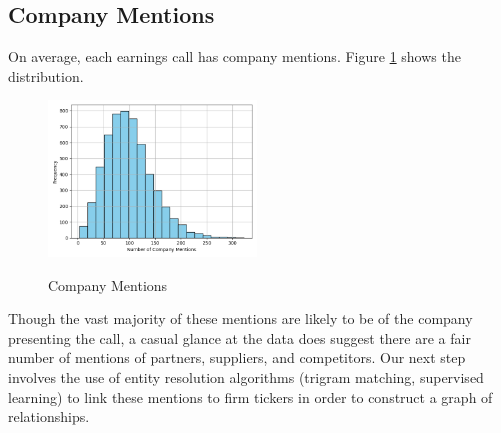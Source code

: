 \documentclass{article}[11pt]
\begin{document}
    \clearpage
    \newpage

    \subsection{Company Mentions}

    \label{sec:company-mentions}

    On average, each earnings call has \avgCompanyMentions \space company mentions. Figure \ref{fig:company-mentions} shows the distribution.

    \begin{figure}[h!]
		\centering
        \caption{Company Mentions}
        \includegraphics[width=0.4925\textwidth,keepaspectratio=true]{../Output/All Data EDA/NLP EDA - NER on Company Names/Company Mentions Distribution No Title.png}
        \label{fig:company-mentions}
	\end{figure}

    Though the vast majority of these mentions are likely to be of the company presenting the call, a casual glance at the data does suggest there are a fair number of mentions of partners, suppliers, and competitors. Our next step involves the use of entity resolution algorithms (trigram matching, supervised learning) to link these mentions to firm tickers in order to construct a graph of relationships.
\end{document}
